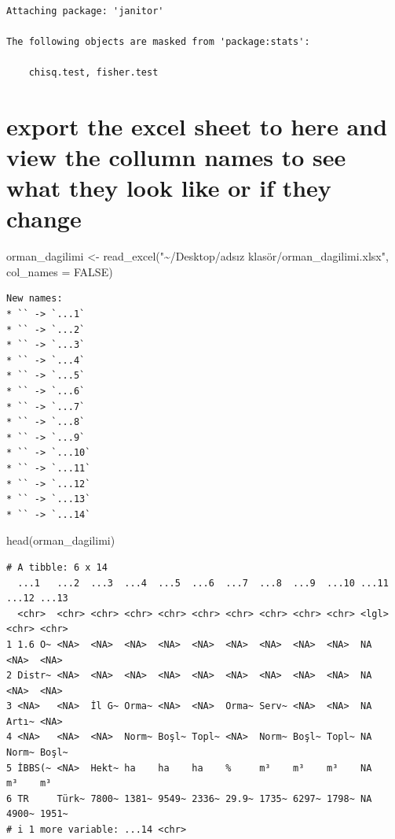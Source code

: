 \documentclass[
  11pt,
  a4paper,
  DIV=11,
  numbers=noendperiod]{scrartcl}
\newenvironment{Shaded}{\begin{snugshade}}{\end{snugshade}}
\newcommand{\AttributeTok}[1]{\textcolor[rgb]{0.40,0.45,0.13}{#1}}
\newcommand{\ConstantTok}[1]{\textcolor[rgb]{0.56,0.35,0.01}{#1}}
\newcommand{\FunctionTok}[1]{\textcolor[rgb]{0.28,0.35,0.67}{#1}}
\newcommand{\NormalTok}[1]{\textcolor[rgb]{0.00,0.23,0.31}{#1}}
\newcommand{\OtherTok}[1]{\textcolor[rgb]{0.00,0.23,0.31}{#1}}
\newcommand{\StringTok}[1]{\textcolor[rgb]{0.13,0.47,0.30}{#1}}
\begin{document}
\begin{verbatim}

Attaching package: 'janitor'

The following objects are masked from 'package:stats':

    chisq.test, fisher.test
\end{verbatim}

\section{export the excel sheet to here and view the collumn names to
see what they look like or if they
change}\label{export-the-excel-sheet-to-here-and-view-the-collumn-names-to-see-what-they-look-like-or-if-they-change}

\begin{Shaded}
\begin{Highlighting}[]
\NormalTok{orman\_dagilimi }\OtherTok{\textless{}{-}} \FunctionTok{read\_excel}\NormalTok{(}\StringTok{"\textasciitilde{}/Desktop/adsız klasör/orman\_dagilimi.xlsx"}\NormalTok{, }
    \AttributeTok{col\_names =} \ConstantTok{FALSE}\NormalTok{)}
\end{Highlighting}
\end{Shaded}

\begin{verbatim}
New names:
* `` -> `...1`
* `` -> `...2`
* `` -> `...3`
* `` -> `...4`
* `` -> `...5`
* `` -> `...6`
* `` -> `...7`
* `` -> `...8`
* `` -> `...9`
* `` -> `...10`
* `` -> `...11`
* `` -> `...12`
* `` -> `...13`
* `` -> `...14`
\end{verbatim}

\begin{Shaded}
\begin{Highlighting}[]
\FunctionTok{head}\NormalTok{(orman\_dagilimi)}
\end{Highlighting}
\end{Shaded}

\begin{verbatim}
# A tibble: 6 x 14
  ...1   ...2  ...3  ...4  ...5  ...6  ...7  ...8  ...9  ...10 ...11 ...12 ...13
  <chr>  <chr> <chr> <chr> <chr> <chr> <chr> <chr> <chr> <chr> <lgl> <chr> <chr>
1 1.6 O~ <NA>  <NA>  <NA>  <NA>  <NA>  <NA>  <NA>  <NA>  <NA>  NA    <NA>  <NA> 
2 Distr~ <NA>  <NA>  <NA>  <NA>  <NA>  <NA>  <NA>  <NA>  <NA>  NA    <NA>  <NA> 
3 <NA>   <NA>  İl G~ Orma~ <NA>  <NA>  Orma~ Serv~ <NA>  <NA>  NA    Artı~ <NA> 
4 <NA>   <NA>  <NA>  Norm~ Boşl~ Topl~ <NA>  Norm~ Boşl~ Topl~ NA    Norm~ Boşl~
5 İBBS(~ <NA>  Hekt~ ha    ha    ha    %     m³    m³    m³    NA    m³    m³   
6 TR     Türk~ 7800~ 1381~ 9549~ 2336~ 29.9~ 1735~ 6297~ 1798~ NA    4900~ 1951~
# i 1 more variable: ...14 <chr>
\end{verbatim}
\end{document}
